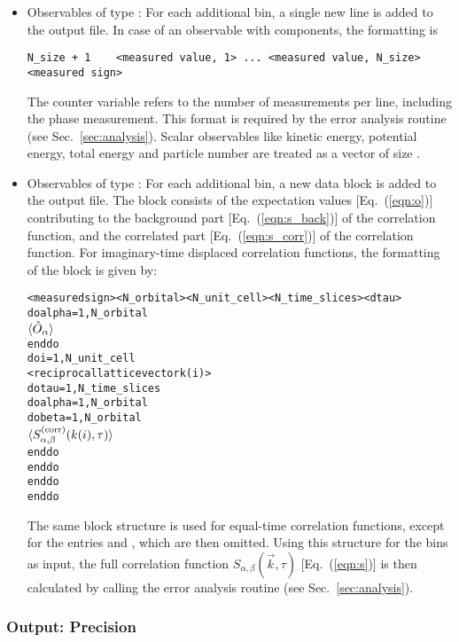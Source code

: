 \begin{itemize}
\item Observables of type :
For each additional bin, a single new line is added to the output file.
In case of an observable with  components, the formatting is 
\begin{verbatim}
N_size + 1    <measured value, 1> ... <measured value, N_size>    <measured sign>
\end{verbatim}
The counter variable  refers to the number of measurements per line, including the phase measurement. 
This format is required by the error analysis routine (see Sec.~\ref{sec:analysis}). 
Scalar observables like kinetic energy, potential energy, total energy and particle number are treated as a vector 
of size .

\item Observables of type :
For each additional bin, a new data block is added to the output file. 
The block consists of the expectation values [Eq.~(\ref{eqn:o})] contributing to the background part [Eq.~(\ref{eqn:s_back})] of the correlation function,
and the correlated part [Eq.~(\ref{eqn:s_corr})] of the correlation function.
For imaginary-time displaced correlation functions, the formatting of the block is given by:
\begin{alltt}
<measured sign>  <N_orbital>  <N_unit_cell>  <N_time_slices>  <dtau>
do alpha = 1, N_orbital
    \(\langle\hat{O}\sb{\alpha}\rangle \)
enddo
do i = 1, N_unit_cell
   <reciprocal lattice vector k(i)>
   do tau = 1, N_time_slices
      do alpha = 1, N_orbital
         do beta = 1, N_orbital
            \(\langle{S}\sb{\alpha,\beta}\sp{(\mathrm{corr})}(k(i),\tau)\rangle\)
         enddo
      enddo
   enddo
enddo
\end{alltt}
The same block structure is used for equal-time correlation functions, except for the entries   and , which are then omitted.
Using this structure for the bins as input, the full correlation function $S_{\alpha,\beta}(\vec{k},\tau)$ [Eq.~(\ref{eqn:s})] is then calculated by calling the error analysis routine (see Sec.~\ref{sec:analysis}).
\end{itemize}

%
\subsubsection{Output: Precision} \label{sec:output_prec}
%


